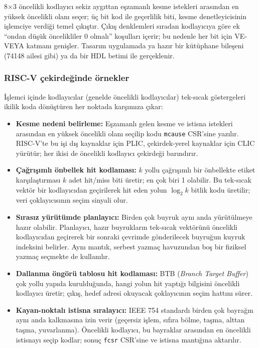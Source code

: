 8×3 öncelikli kodlayıcı sekiz aygıttan eşzamanlı kesme istekleri arasından en yüksek öncelikli olanı seçer; üç bit kod ile geçerlilik biti, kesme denetleyicisinin işlemciye verdiği temel çıkıştır. Çıkış denklemleri sıradan kodlayıcıya göre ek ``ondan düşük öncelikliler 0 olmalı'' koşulları içerir; bu nedenle her bit için VE-VEYA katmanı genişler. Tasarım uygulamada ya hazır bir kütüphane bileşeni (74148 ailesi gibi) ya da bir HDL betimi ile gerçeklenir.


\subsubsection{RISC-V çekirdeğinde örnekler}
İşlemci içinde kodlayıcılar (genelde öncelikli kodlayıcılar) tek-sıcak göstergeleri ikilik koda dönüştüren her noktada karşımıza çıkar:

\begin{itemize}[nosep]
  \item \textbf{Kesme nedeni belirleme:} Eşzamanlı gelen kesme ve istisna istekleri arasından en yüksek öncelikli olanı seçilip kodu \texttt{mcause} CSR'sine yazılır. RISC-V'te bu işi dış kaynaklar için PLIC, çekirdek-yerel kaynaklar için CLIC yürütür; her ikisi de öncelikli kodlayıcı çekirdeği barındırır.
  \item \textbf{Çağrışımlı önbellek hit kodlaması:} $k$ yollu çağrışımlı bir önbellekte etiket karşılaştırması $k$ adet hit/miss biti üretir; en çok biri 1 olabilir. Bu tek-sıcak vektör bir kodlayıcıdan geçirilerek hit eden yolun $\log_2 k$ bitlik kodu üretilir; veri çoklayıcısının seçim sinyali olur.
  \item \textbf{Sırasız yürütümde planlayıcı:} Birden çok buyruk aynı anda yürütülmeye hazır olabilir. Planlayıcı, hazır buyrukların tek-sıcak vektörünü öncelikli kodlayıcıdan geçirerek bir sonraki çevrimde gönderilecek buyruğun kuyruk indeksini belirler. Aynı mantık, serbest yazmaç havuzundan boş bir fiziksel yazmaç seçmekte de kullanılır.
  \item \textbf{Dallanma öngörü tablosu hit kodlaması:} BTB (\emph{Branch Target Buffer}) çok yollu yapıda kurulduğunda, hangi yolun hit yaptığı bilgisini öncelikli kodlayıcı üretir; çıkış, hedef adresi okuyacak çoklayıcının seçim hattını sürer.
  \item \textbf{Kayan-noktalı istisna sıralayıcı:} IEEE 754 standardı birden çok bayrağın aynı anda kalkmasına izin verir (geçersiz işlem, sıfıra bölme, taşma, alttan taşma, yuvarlanma). Öncelikli kodlayıcı, bu bayraklar arasından en öncelikli istisnayı seçip kodlar; sonuç \texttt{fcsr} CSR'sine ve istisna mantığına aktarılır.
\end{itemize}


